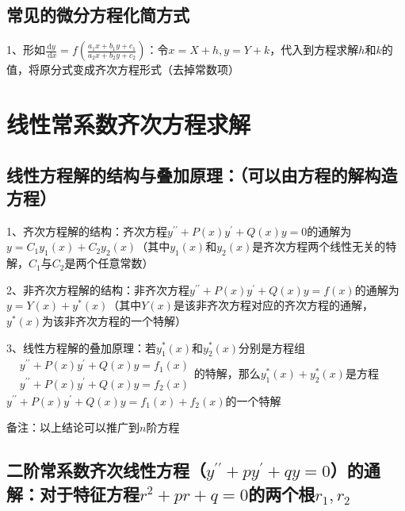 \subsection{常见的微分方程化简方式}

1、形如$\frac{\mathrm{d} y}{\mathrm{~d} x}=f\left(\frac{a_{1} x+b_{1} y+c_{1}}{a_{2} x+b_{2} y+c_{2}}\right)$：令$x=X+h, y=Y+k$，代入到方程求解$h$和$k$的值，将原分式变成齐次方程形式（去掉常数项）

\section{线性常系数齐次方程求解}



\subsection{线性方程解的结构与叠加原理：（可以由方程的解构造方程）}

1、齐次方程解的结构：齐次方程$y^{\prime \prime}+P(x) y^{\prime}+Q(x) y=0$的通解为$y=C_{1} y_{1}(x)+C_{2} y_{2}(x)$（其中$y_{1}(x)$和$y_{2}(x)$是齐次方程两个线性无关的特解，$C_{1}$与$C_{2}$是两个任意常数）

2、非齐次方程解的结构：非齐次方程$y^{\prime \prime}+P(x) y^{\prime}+Q(x) y=f(x)$的通解为$y=Y(x)+y^{*}(x)$（其中$Y(x)$是该非齐次方程对应的齐次方程的通解，$y^{*}(x)$为该非齐次方程的一个特解）

3、线性方程解的叠加原理：若$y_{1}^{*}(x)$和$y_{2}^{*}(x)$分别是方程组$\begin{aligned} &y^{\prime \prime}+P(x) y^{\prime}+Q(x) y=f_{1}(x) \\ &y^{\prime \prime}+P(x) y^{\prime}+Q(x) y=f_{2}(x) \end{aligned}$的特解，那么$y_{1}^{*}(x)+y_{2}^{*}(x)$是方程$y^{\prime \prime}+P(x) y^{\prime}+Q(x) y=f_{1}(x)+f_{2}(x)$的一个特解

备注：以上结论可以推广到$n$阶方程



\subsection{二阶常系数齐次线性方程（$y^{\prime \prime}+p y^{\prime}+q y=0$）的通解：对于特征方程$r^{2}+p r+q=0$的两个根$ r_{1}, r_{2} $}

